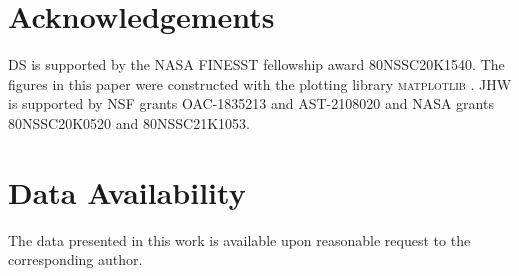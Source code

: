 \documentclass[fleqn,usenatbib]{mnras}
\begin{document}
\section*{Acknowledgements}

DS is supported by the NASA FINESST fellowship award 80NSSC20K1540. The figures in this paper were constructed with the plotting library \textsc{matplotlib} \citep{matplotlib}.  JHW is supported by NSF grants OAC-1835213 and AST-2108020 and NASA grants 80NSSC20K0520 and 80NSSC21K1053.

\section*{Data Availability}

The data presented in this work is available upon reasonable request to the corresponding author.



\typeout{}










\bsp	%
\label{lastpage}
\end{document}
